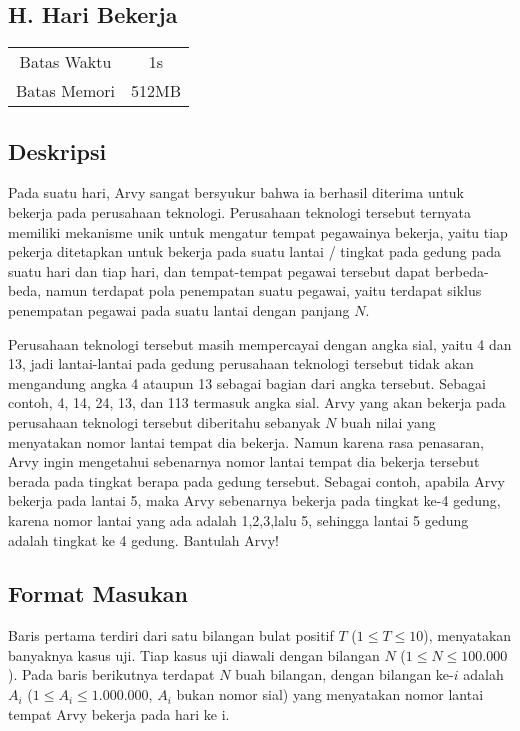 \documentclass{article}
\begin{document}
\begin{center}
    \section*{H. Hari Bekerja}

    \begin{tabular}{ | c c | }
        \hline
        Batas Waktu  & 1s \\
        Batas Memori & 512MB \\ 
        \hline
    \end{tabular}
\end{center}

\subsection*{Deskripsi}

Pada suatu hari, Arvy sangat bersyukur bahwa ia berhasil diterima untuk bekerja pada perusahaan teknologi. Perusahaan teknologi tersebut ternyata memiliki mekanisme unik untuk mengatur tempat pegawainya bekerja, yaitu tiap pekerja ditetapkan untuk bekerja pada suatu lantai / tingkat pada gedung pada suatu hari dan tiap hari, dan tempat-tempat pegawai tersebut dapat berbeda-beda, namun terdapat pola penempatan suatu pegawai, yaitu terdapat siklus penempatan pegawai pada suatu lantai dengan panjang $N$. 

Perusahaan teknologi tersebut masih mempercayai dengan angka sial, yaitu 4 dan 13, jadi lantai-lantai pada gedung perusahaan teknologi tersebut tidak akan mengandung angka 4 ataupun 13 sebagai bagian dari angka tersebut. Sebagai contoh, 4, 14, 24, 13, dan 113 termasuk angka sial. Arvy yang akan bekerja pada perusahaan teknologi tersebut diberitahu sebanyak $N$ buah nilai yang menyatakan nomor lantai tempat dia bekerja. Namun karena rasa penasaran, Arvy ingin mengetahui sebenarnya nomor lantai tempat dia bekerja tersebut berada pada tingkat berapa pada gedung tersebut. Sebagai contoh, apabila Arvy bekerja pada lantai 5, maka Arvy sebenarnya bekerja pada tingkat ke-4 gedung, karena nomor lantai yang ada adalah 1,2,3,lalu 5, sehingga lantai 5 gedung adalah tingkat ke 4 gedung. Bantulah Arvy!

\subsection*{Format Masukan}

Baris pertama terdiri dari satu bilangan bulat positif $T$ ($1 \leq T \leq 10$), menyatakan banyaknya kasus uji.
Tiap kasus uji diawali dengan bilangan $N$ ($1 \leq N \leq 100.000$).
Pada baris berikutnya terdapat $N$ buah bilangan, dengan bilangan ke-$i$ adalah $A_i$ ($1 \leq A_i \leq 1.000.000$, $A_i$ bukan nomor sial) yang menyatakan nomor lantai tempat Arvy bekerja pada hari ke i.
\end{document}
